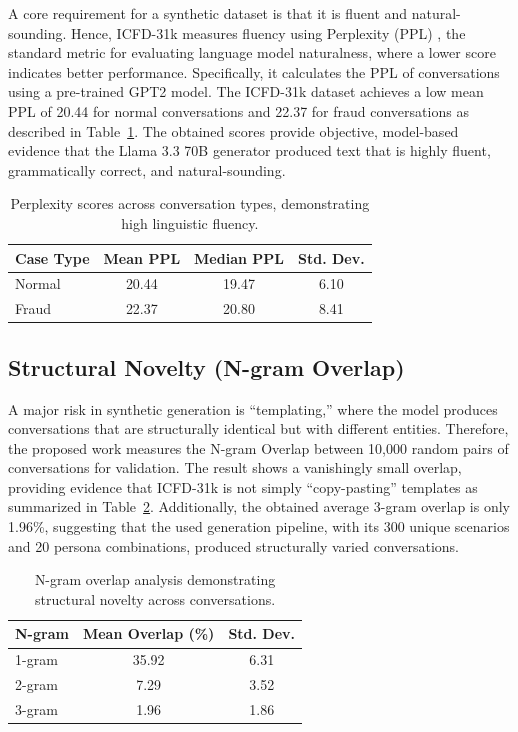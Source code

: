 \documentclass{article}
\begin{document}
A core requirement for a synthetic dataset is that it is fluent and natural-sounding. Hence, ICFD-31k measures fluency using Perplexity (PPL) \cite{jelinek1977perplex}, the standard metric for evaluating language model naturalness, where a lower score indicates better performance. Specifically, it calculates the PPL of conversations using a pre-trained GPT2 model. The ICFD-31k dataset achieves a low mean PPL of 20.44 for normal conversations and 22.37 for fraud conversations as described in Table~\ref{tab:perplexity}. The obtained scores provide objective, model-based evidence that the Llama 3.3 70B \cite{dubey2024llama} generator produced text that is highly fluent, grammatically correct, and natural-sounding.

\begin{table}[t]
\centering
\caption{Perplexity scores across conversation types, demonstrating high linguistic fluency.}
\label{tab:perplexity}
\begin{tabular}{@{}lccc@{}}
\toprule
Case Type & Mean PPL & Median PPL & Std. Dev. \\ \midrule
Normal & 20.44 & 19.47 & 6.10 \\
Fraud & 22.37 & 20.80 & 8.41 \\ \bottomrule
\end{tabular}
\end{table}

\subsection{Structural Novelty (N-gram Overlap)}

A major risk in synthetic generation is ``templating,'' where the model produces conversations that are structurally identical but with different entities. Therefore, the proposed work measures the N-gram Overlap between 10,000 random pairs of conversations for validation. The result shows a vanishingly small overlap, providing evidence that ICFD-31k is not simply ``copy-pasting'' templates as summarized in Table~\ref{tab:ngram}. Additionally, the obtained average 3-gram overlap is only 1.96\%, suggesting that the used generation pipeline, with its 300 unique scenarios and 20 persona combinations, produced structurally varied conversations.

\begin{table}[t]
\centering
\caption{N-gram overlap analysis demonstrating structural novelty across conversations.}
\label{tab:ngram}
\begin{tabular}{@{}lcc@{}}
\toprule
N-gram & Mean Overlap (\%) & Std. Dev. \\ \midrule
1-gram & 35.92 & 6.31 \\
2-gram & 7.29 & 3.52 \\
3-gram & 1.96 & 1.86 \\ \bottomrule
\end{tabular}
\end{table}
\end{document}
